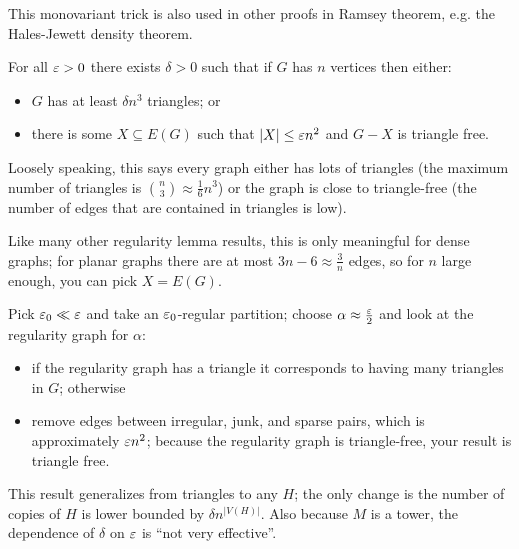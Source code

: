 \documentclass[main.tex]{subfiles}
\begin{document}
This monovariant trick is also used in other proofs in Ramsey theorem,
e.g. the Hales-Jewett density theorem.

\begin{lemma}
  For all $\varepsilon > 0$ there exists $\delta > 0$ such that if $G$ has $n$ vertices
  then either:
  \begin{itemize}
    \item $G$ has at least $\delta n^3$ triangles; or
    \item there is some $X\subseteq E(G)$ such that $|X|\leq\varepsilon n^2$ and
      $G - X$ is triangle free.
  \end{itemize}
\end{lemma}
Loosely speaking, this says every graph either has lots of triangles
(the maximum number of triangles is $\binom{n}{3}\approx\frac{1}{6}n^3$)
or the graph is close to triangle-free (the number of edges that are contained
in triangles is low).

Like many other regularity lemma results, this is only meaningful for dense
graphs; for planar graphs there are at most $3n-6\approx\frac{3}{n}$ edges,
so for $n$ large enough, you can pick $X = E(G)$.
\begin{motivation*}
  Pick $\varepsilon_0\ll\varepsilon$ and take an $\varepsilon_0$-regular partition; choose
  $\alpha\approx\frac{\varepsilon}{2}$ and look at the regularity graph for $\alpha$:
  \begin{itemize}
    \item if the regularity graph has a triangle it corresponds to having
      many triangles in $G$; otherwise

    \item remove edges between irregular, junk, and sparse pairs, which is
      approximately $\varepsilon n^2$; because the regularity graph is triangle-free,
      your result is triangle free.
  \end{itemize}
\end{motivation*}
This result generalizes from triangles to any $H$; the only change is the
number of copies of $H$ is lower bounded by $\delta n^{|V(H)|}$.
Also because $M$ is a tower, the dependence of $\delta$ on $\varepsilon$ is
``not very effective''.
\end{document}
